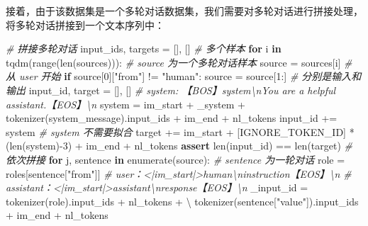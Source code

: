 \documentclass[
]{article}
\newenvironment{Shaded}{}{}
\newcommand{\BuiltInTok}[1]{\textcolor[rgb]{0.00,0.50,0.00}{#1}}
\newcommand{\CommentTok}[1]{\textcolor[rgb]{0.38,0.63,0.69}{\textit{#1}}}
\newcommand{\ControlFlowTok}[1]{\textcolor[rgb]{0.00,0.44,0.13}{\textbf{#1}}}
\newcommand{\DecValTok}[1]{\textcolor[rgb]{0.25,0.63,0.44}{#1}}
\newcommand{\KeywordTok}[1]{\textcolor[rgb]{0.00,0.44,0.13}{\textbf{#1}}}
\newcommand{\NormalTok}[1]{#1}
\newcommand{\OperatorTok}[1]{\textcolor[rgb]{0.40,0.40,0.40}{#1}}
\newcommand{\StringTok}[1]{\textcolor[rgb]{0.25,0.44,0.63}{#1}}
\begin{document}
接着，由于该数据集是一个多轮对话数据集，我们需要对多轮对话进行拼接处理，将多轮对话拼接到一个文本序列中：

\begin{Shaded}
\begin{Highlighting}[]
\CommentTok{\# 拼接多轮对话}
\NormalTok{input\_ids, targets }\OperatorTok{=}\NormalTok{ [], []}
\CommentTok{\# 多个样本}
\ControlFlowTok{for}\NormalTok{ i }\KeywordTok{in}\NormalTok{ tqdm(}\BuiltInTok{range}\NormalTok{(}\BuiltInTok{len}\NormalTok{(sources))):}
    \CommentTok{\# source 为一个多轮对话样本}
\NormalTok{    source }\OperatorTok{=}\NormalTok{ sources[i]}
    \CommentTok{\# 从 user 开始}
    \ControlFlowTok{if}\NormalTok{ source[}\DecValTok{0}\NormalTok{][}\StringTok{"from"}\NormalTok{] }\OperatorTok{!=} \StringTok{"human"}\NormalTok{:}
\NormalTok{        source }\OperatorTok{=}\NormalTok{ source[}\DecValTok{1}\NormalTok{:]}
    \CommentTok{\# 分别是输入和输出}
\NormalTok{    input\_id, target }\OperatorTok{=}\NormalTok{ [], []}
    \CommentTok{\# system: 【BOS】system\textbackslash{}nYou are a helpful assistant.【EOS】\textbackslash{}n}
\NormalTok{    system }\OperatorTok{=}\NormalTok{ im\_start }\OperatorTok{+}\NormalTok{ \_system }\OperatorTok{+}\NormalTok{ tokenizer(system\_message).input\_ids }\OperatorTok{+}\NormalTok{ im\_end }\OperatorTok{+}\NormalTok{ nl\_tokens}
\NormalTok{    input\_id }\OperatorTok{+=}\NormalTok{ system}
    \CommentTok{\# system 不需要拟合}
\NormalTok{    target }\OperatorTok{+=}\NormalTok{ im\_start }\OperatorTok{+}\NormalTok{ [IGNORE\_TOKEN\_ID] }\OperatorTok{*}\NormalTok{ (}\BuiltInTok{len}\NormalTok{(system)}\OperatorTok{{-}}\DecValTok{3}\NormalTok{) }\OperatorTok{+}\NormalTok{ im\_end }\OperatorTok{+}\NormalTok{ nl\_tokens}
    \ControlFlowTok{assert} \BuiltInTok{len}\NormalTok{(input\_id) }\OperatorTok{==} \BuiltInTok{len}\NormalTok{(target)}
    \CommentTok{\# 依次拼接}
    \ControlFlowTok{for}\NormalTok{ j, sentence }\KeywordTok{in} \BuiltInTok{enumerate}\NormalTok{(source):}
        \CommentTok{\# sentence 为一轮对话}
\NormalTok{        role }\OperatorTok{=}\NormalTok{ roles[sentence[}\StringTok{"from"}\NormalTok{]]}
        \CommentTok{\# user：\textless{}|im\_start|\textgreater{}human\textbackslash{}ninstruction【EOS】\textbackslash{}n}
        \CommentTok{\# assistant：\textless{}|im\_start|\textgreater{}assistant\textbackslash{}nresponse【EOS】\textbackslash{}n}
\NormalTok{        \_input\_id }\OperatorTok{=}\NormalTok{ tokenizer(role).input\_ids }\OperatorTok{+}\NormalTok{ nl\_tokens }\OperatorTok{+} \OperatorTok{\textbackslash{}}
\NormalTok{            tokenizer(sentence[}\StringTok{"value"}\NormalTok{]).input\_ids }\OperatorTok{+}\NormalTok{ im\_end }\OperatorTok{+}\NormalTok{ nl\_tokens}

\end{Highlighting}
\end{Shaded}
\end{document}
